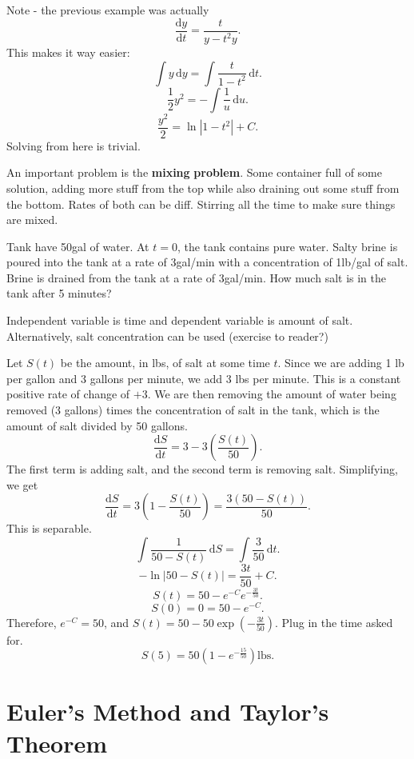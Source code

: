 
Note - the previous example was actually
\[
	\frac{\mathrm{d}y}{\mathrm{d}t} =\frac{t}{y-t^2y}
.\]
This makes it way easier:
\[
	\int y \,\mathrm{d} y=\int \frac{t}{1-t^2} \,\mathrm{d} t
.\]
\[
	\frac{1}{2}y^2=-\int \frac{1}{u} \,\mathrm{d} u
.\]
\[
	\frac{y^2}{2}=\ln \left| 1-t^2 \right| +C
.\]
Solving from here is trivial.

An important problem is the \textbf{mixing} \textbf{problem}. Some container full of some solution, adding more stuff from the top while also draining out some stuff from the bottom. Rates of both can be diff. Stirring all the time to make sure things are mixed.
\begin{example}
	Tank have 50gal of water. At $t=0$, the tank contains pure water. Salty brine is poured into the tank at a rate of 3gal/min with a concentration of 1lb/gal of salt. Brine is drained from the tank at a rate of 3gal/min. How much salt is in the tank after 5 minutes?
\end{example}
\begin{solution}
	Independent variable is time and dependent variable is amount of salt. Alternatively, salt concentration can be used (exercise to reader?)

	Let $S(t)$ be the amount, in lbs, of salt at some time $t$. Since we are adding 1 lb per gallon and 3 gallons per minute, we add 3 lbs per minute. This is a constant positive rate of change of $+3$. We are then removing the amount of water being removed (3 gallons) times the concentration of salt in the tank, which is the amount of salt divided by 50 gallons.
	\[
		\frac{\mathrm{d}S}{\mathrm{d}t} =3-3\left( \frac{S(t)}{50} \right) 
	.\]
	The first term is adding salt, and the second term is removing salt. Simplifying, we get
	\[
		\frac{\mathrm{d}S}{\mathrm{d}t} =3\left( 1-\frac{S(t)}{50} \right) =\frac{3(50-S(t))}{50}
	.\]
	This is separable.
	\[
		\int \frac{1}{50-S(t)} \,\mathrm{d} S=\int \frac{3}{50} \,\mathrm{d} t
	.\]
	\[
		-\ln \left| 50-S(t) \right| =\frac{3t}{50}+C
	.\]
	\[
		S(t)=50-e^{-C}e^{-\frac{3t}{50}}
	.\]
	\[
		S(0)=0=50-e^{-C}
	.\]
	Therefore, $e^{-C}=50$, and $S(t)=50-50\exp \left( -\frac{3t}{50} \right) $.
	Plug in the time asked for.
	\[
		S(5)=50\left( 1-e^{-\frac{15}{50}} \right) \text{lbs}
	.\]
\end{solution}
\section{Euler's Method and Taylor's Theorem}

